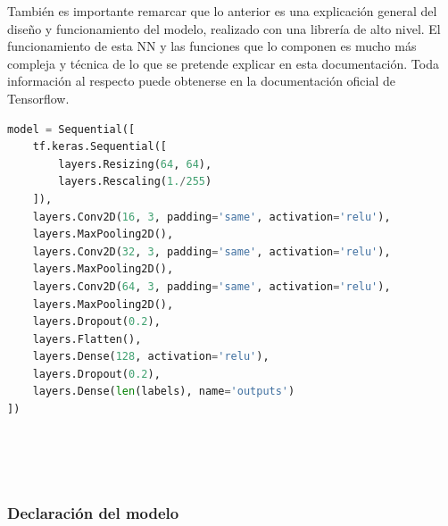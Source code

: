 \documentclass{article}
\begin{document}
También es importante remarcar que lo anterior es una explicación general del diseño y funcionamiento del modelo, realizado con una librería de alto nivel. El funcionamiento de esta NN y las funciones que lo componen es mucho más compleja y técnica de lo que se pretende explicar en esta documentación. Toda información al respecto puede obtenerse en la documentación oficial de Tensorflow.\\

\noindent\begin{minipage}{\textwidth}
\begin{lstlisting}[language=python]
model = Sequential([
	tf.keras.Sequential([
    	layers.Resizing(64, 64),
    	layers.Rescaling(1./255)
	]),
	layers.Conv2D(16, 3, padding='same', activation='relu'),
	layers.MaxPooling2D(),
	layers.Conv2D(32, 3, padding='same', activation='relu'),
	layers.MaxPooling2D(),
	layers.Conv2D(64, 3, padding='same', activation='relu'),
	layers.MaxPooling2D(),
	layers.Dropout(0.2),
	layers.Flatten(),
	layers.Dense(128, activation='relu'),
	layers.Dropout(0.2),
	layers.Dense(len(labels), name='outputs')
])
\end{lstlisting}
\end{minipage}\\\\\\


\subsubsection{Declaración del modelo}
\end{document}
